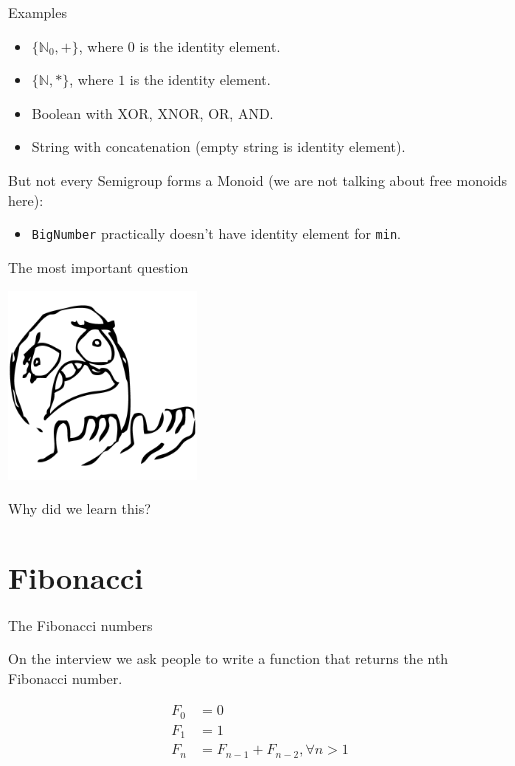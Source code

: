 \documentclass[presentation,aspectratio=169,smaller]{beamer}
\begin{document}
\begin{frame}[label={sec:orgab590d5},fragile]{Examples}
 \begin{itemize}
\item \(\{\mathbb{N}_0, +\}\), where \(0\) is the identity element.
\item \(\{\mathbb{N}, *\}\), where \(1\) is the identity element.
\item Boolean with XOR, XNOR, OR, AND.
\item String with concatenation (empty string is identity element).
\end{itemize}

\pause

But not every Semigroup forms a Monoid (we are not talking about free monoids
here):

\begin{itemize}
\item \texttt{BigNumber} practically doesn’t have identity element for \texttt{min}.
\end{itemize}
\end{frame}

\begin{frame}[label={sec:orgf7f3d17}]{The most important question}
\pause

\begin{center}
\includegraphics[height=5cm]{images/whyyy.png}
\end{center}

Why did we learn this?
\end{frame}

\section*{Fibonacci}
\label{sec:org0f520b2}

\begin{frame}[label={sec:orge2c5564}]{The Fibonacci numbers}
\pause

On the interview we ask people to write a function that returns the nth
Fibonacci number.

\pause

\begin{align*}
  F_0 &= 0 \\
  F_1 &= 1 \\
  F_n &= F_{n - 1} + F_{n - 2}, \forall n > 1 \\
\end{align*}
\end{frame}
\end{document}
